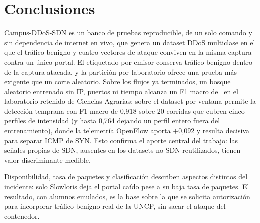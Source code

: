 \documentclass[a4paper,fleqn]{cas-dc}
\begin{document}
\section{Conclusiones}\label{sec:conclusiones}
Campus-DDoS-SDN es un banco de pruebas reproducible, de un solo comando y sin dependencia de internet en vivo, que genera un dataset DDoS multiclase en el que el tráfico benigno y cuatro vectores de ataque conviven en la misma captura contra un único portal. El etiquetado por emisor conserva tráfico benigno dentro de la captura atacada, y la partición por laboratorio ofrece una prueba más exigente que un corte aleatorio. Sobre los flujos ya terminados, un bosque aleatorio entrenado sin IP, puertos ni tiempo alcanza un F1 macro de \FmacroEs\ en el laboratorio retenido de Ciencias Agrarias; sobre el dataset por ventana permite la detección temprana con F1 macro de 0{,}918 sobre 20 corridas que cubren cinco perfiles de intensidad (y hasta 0{,}764 dejando un perfil entero fuera del entrenamiento), donde la telemetría OpenFlow aporta $+$0{,}092 y resulta decisiva para separar ICMP de SYN. Esto confirma el aporte central del trabajo: las señales propias de SDN, ausentes en los datasets no-SDN reutilizados, tienen valor discriminante medible. 

Disponibilidad, tasa de paquetes y clasificación describen aspectos distintos del incidente: solo Slowloris deja el portal caído pese a su baja tasa de paquetes. El resultado, con alumnos emulados, es la base sobre la que se solicita autorización para incorporar tráfico benigno real de la UNCP, sin sacar el ataque del contenedor.



\end{document}

